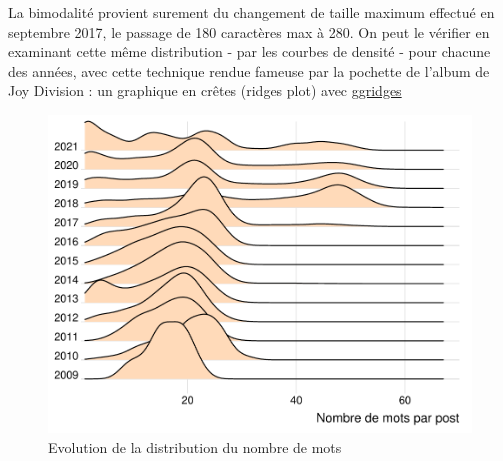 \documentclass[
]{book}
\newenvironment{Shaded}{\begin{snugshade}}{\end{snugshade}}
\newcommand{\CommentTok}[1]{\textcolor[rgb]{0.56,0.35,0.01}{\textit{#1}}}
\newcommand{\DataTypeTok}[1]{\textcolor[rgb]{0.13,0.29,0.53}{#1}}
\newcommand{\DecValTok}[1]{\textcolor[rgb]{0.00,0.00,0.81}{#1}}
\newcommand{\KeywordTok}[1]{\textcolor[rgb]{0.13,0.29,0.53}{\textbf{#1}}}
\newcommand{\NormalTok}[1]{#1}
\newcommand{\OperatorTok}[1]{\textcolor[rgb]{0.81,0.36,0.00}{\textbf{#1}}}
\newcommand{\OtherTok}[1]{\textcolor[rgb]{0.56,0.35,0.01}{#1}}
\newcommand{\StringTok}[1]{\textcolor[rgb]{0.31,0.60,0.02}{#1}}
\begin{document}
La bimodalité provient surement du changement de taille maximum effectué en septembre 2017, le passage de 180 caractères max à 280. On peut le vérifier en examinant cette même distribution - par les courbes de densité - pour chacune des années, avec cette technique rendue fameuse par la pochette de l'album de Joy Division : un graphique en crêtes (ridges plot) avec \href{https://cran.r-project.org/web/packages/ggridges/vignettes/introduction.html}{ggridges}

\begin{Shaded}
\end{Shaded}

\begin{figure}

{\centering \includegraphics[width=0.8\linewidth]{bookdown-demo_files/figure-latex/2-1} 

}

\caption{ Evolution de la distribution du nombre de mots}\label{fig:2}
\end{figure}
\end{document}
